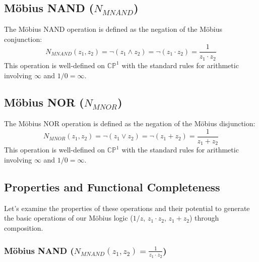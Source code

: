 	\subsection{Möbius NAND ($N_{MNAND}$)}

	The M\"{o}bius NAND operation is defined as the negation of the M\"{o}bius conjunction:
	$$N_{MNAND}(z_1, z_2) = \neg(z_1 \wedge z_2) = \neg(z_1 \cdot z_2) = \frac{1}{z_1 \cdot z_2}$$
	This operation is well-defined on $\mathbb{CP}^1$ with the standard rules for arithmetic involving $\infty$ and $1/0 = \infty$.

	\subsection{Möbius NOR ($N_{MNOR}$)}

	The M\"{o}bius NOR operation is defined as the negation of the M\"{o}bius disjunction:
	$$N_{MNOR}(z_1, z_2) = \neg(z_1 \vee z_2) = \neg(z_1 + z_2) = \frac{1}{z_1 + z_2}$$
	This operation is well-defined on $\mathbb{CP}^1$ with the standard rules for arithmetic involving $\infty$ and $1/0 = \infty$.

	\subsection{Properties and Functional Completeness}

	Let's examine the properties of these operations and their potential to generate the basic operations of our M\"{o}bius logic ($1/z$, $z_1 \cdot z_2$, $z_1 + z_2$) through composition.

	\subsubsection{Möbius NAND ($N_{MNAND}(z_1, z_2) = \frac{1}{z_1 \cdot z_2}$)}

